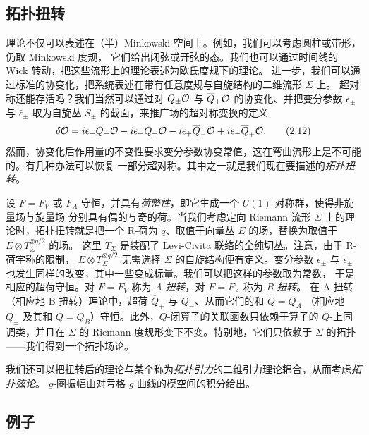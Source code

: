 \subsection{拓扑扭转}
\label{sec:twist}

理论不仅可以表述在（半）Minkowski 空间上。例如，我们可以考虑圆柱或带形，仍取 Minkowski 度规，
它们给出闭弦或开弦的态。我们也可以通过时间线的 Wick 转动，把这些流形上的理论表述为欧氏度规下的理论。
进一步，我们可以通过标准的协变化，把系统表述在带有任意度规与自旋结构的二维流形 $\Sigma$ 上。
超对称还能存活吗？我们当然可以通过对 $Q_\pm\mathcal{O}$ 与 $\overline Q_\pm\mathcal{O}$ 的协变化、并把变分参数
$\epsilon_\pm$ 与 $\bar\epsilon_\pm$ 取为自旋丛 $S_\pm$ 的截面，来推广场的超对称变换的定义
\begin{equation}
  \delta\mathcal{O}=i\epsilon_+Q_-\mathcal{O}-i\epsilon_-Q_+\mathcal{O}-i\bar\epsilon_+\overline Q_-\mathcal{O}+i\bar\epsilon_-\overline Q_+\mathcal{O}. \tag{2.12}
\end{equation}
然而，协变化后作用量的不变性要求变分参数协变常值，这在弯曲流形上是不可能的。有几种办法可以恢复
一部分超对称。其中之一就是我们现在要描述的\emph{拓扑扭转}。

设 $F=F_V$ 或 $F_A$ 守恒，并具有\emph{荷整性}，即它生成一个 $U(1)$ 对称群，使得非旋量场与旋量场
分别具有偶的与奇的荷。当我们考虑定向 Riemann 流形 $\Sigma$ 上的理论时，拓扑扭转就是把一个
R-荷为 $q$、取值于向量丛 $E$ 的场，替换为取值于 $E\otimes T_\Sigma^{\otimes q/2}$ 的场。
这里 $T_\Sigma$ 是装配了 Levi-Civita 联络的全纯切丛。注意，由于 R-荷宇称的限制，
$E\otimes T_\Sigma^{\otimes q/2}$ 无需选择 $\Sigma$ 的自旋结构便有定义。变分参数 $\epsilon_\pm$
与 $\bar\epsilon_\pm$ 也发生同样的改变，其中一些变成标量。我们可以把这样的参数取为常数，
于是相应的超荷守恒。对 $F=F_V$ 称为 \emph{A-扭转}，对 $F=F_A$ 称为 \emph{B-扭转}。
在 A-扭转（相应地 B-扭转）理论中，超荷 $\overline Q_+$ 与 $Q_-$、从而它们的和 $Q=Q_A$
（相应地 $\overline Q_\pm$ 及其和 $Q=Q_B$）守恒。此外，$Q$-闭算子的关联函数只依赖于算子的
$Q$-上同调类，并且在 $\Sigma$ 的 Riemann 度规形变下不变。特别地，它们只依赖于 $\Sigma$ 的拓扑
——我们得到一个拓扑场论。

我们还可以把扭转后的理论与某个称为\emph{拓扑引力}的二维引力理论耦合，从而考虑\emph{拓扑弦论}。
$g$-圈振幅由对亏格 $g$ 曲线的模空间的积分给出。

\subsection{例子}
\label{sec:examples}


